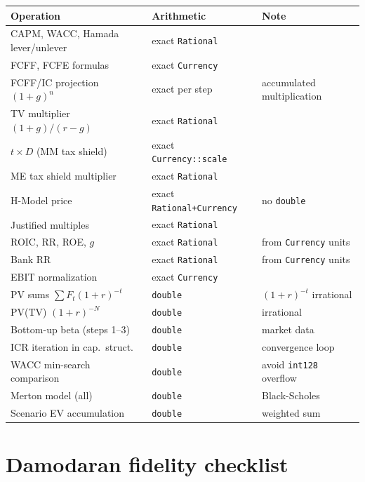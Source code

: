 \documentclass[11pt, a4paper, oneside]{article}
\begin{document}
\begin{center}
\small
\begin{tabular}{lll}
\toprule
Operation & Arithmetic & Note\\
\midrule
CAPM, WACC, Hamada lever/unlever & exact \texttt{Rational} & \\
FCFF, FCFE formulas & exact \texttt{Currency} & \\
FCFF/IC projection $(1+g)^n$ & exact per step & accumulated multiplication\\
TV multiplier $(1+g)/(r-g)$ & exact \texttt{Rational} & \\
$t \times D$ (MM tax shield) & exact \texttt{Currency::scale} & \\
ME tax shield multiplier & exact \texttt{Rational} & \\
H-Model price & exact \texttt{Rational+Currency} & no \texttt{double}\\
Justified multiples & exact \texttt{Rational} & \\
ROIC, RR, ROE, $g$ & exact \texttt{Rational} & from \texttt{Currency} units\\
Bank RR & exact \texttt{Rational} & from \texttt{Currency} units\\
EBIT normalization & exact \texttt{Currency} & \\
\midrule
PV sums $\sum F_t(1+r)^{-t}$ & \texttt{double} & $(1+r)^{-t}$ irrational\\
PV(TV) $(1+r)^{-N}$ & \texttt{double} & irrational\\
Bottom-up beta (steps 1--3) & \texttt{double} & market data\\
ICR iteration in cap.\ struct. & \texttt{double} & convergence loop\\
WACC min-search comparison & \texttt{double} & avoid \texttt{int128} overflow\\
Merton model (all) & \texttt{double} & Black-Scholes\\
Scenario EV accumulation & \texttt{double} & weighted sum\\
\bottomrule
\end{tabular}
\end{center}

\section{Damodaran fidelity checklist}
\label{sec:checklist}
\end{document}
